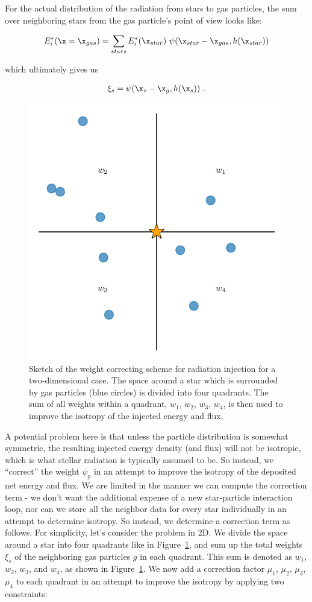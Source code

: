 For the actual distribution of the radiation from stars to gas particles, the sum over neighboring
stars from the gas particle's point of view looks like:

\begin{align}
	E^*_i (\x = \x_{gas}) = \sum_{stars} E^*_i(\x_{star}) \ \psi(\x_{star} - \x_{gas}, h(\x_{star}))
\end{align}

which ultimately gives us

\begin{align}
    \xi_s = \psi(\x_{s} - \x_{g}, h(\x_{s})) \ .
\end{align}


\begin{figure}
	\centering
	\includegraphics[width=.6\textwidth]{figures/RHD/flux_correction_method_plot.pdf}%
	\caption[Sketch of the weight correcting scheme for radiation injection]{
Sketch of the weight correcting scheme for radiation injection for a two-dimensional case. The
space
around a star which is surrounded by gas particles (blue circles) is divided into four quadrants.
The sum of all weights within a quadrant, $w_1$, $w_2$, $w_3$, $w_4$, is then used to improve the
isotropy of the injected energy and flux.
    }
	\label{fig:flux-injection-correction-method}
\end{figure}

A potential problem here is that unless the particle distribution is somewhat symmetric, the
resulting injected energy density (and flux) will not be isotropic, which is what stellar radiation
is typically assumed to be. So instead, we ``correct'' the weight $\psi_p$ in an attempt to improve
the isotropy of the deposited net energy and flux. We are limited in the manner we can compute the
correction term - we don't want the additional expense of a new star-particle interaction loop, nor
can we store all the neighbor data for every star individually in an attempt to determine isotropy.
So instead, we determine a correction term as follows.
For simplicity, let's consider the problem in 2D. We divide the space around a star into four
quadrants like in Figure~\ref{fig:flux-injection-correction-method}, and sum up the total weights
$\xi_s$ of the neighboring gas particles $g$ in each quadrant. This sum is denoted as $w_1$,
$w_2$, $w_3$, and $w_4$, as shown in Figure~\ref{fig:flux-injection-correction-method}. We now add
a correction factor $\mu_1$,  $\mu_2$,  $\mu_3$,  $\mu_4$ to each quadrant in an attempt to improve
the isotropy by applying two constraints:

